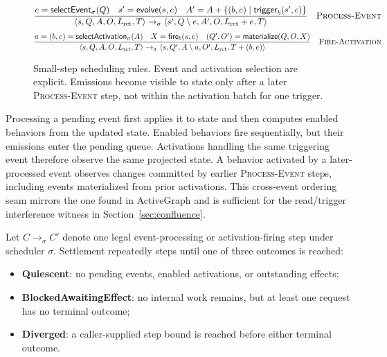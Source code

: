 \begin{figure}[ht]
\centering
\small
\begin{minipage}{0.96\textwidth}
\[
\frac{
 e=\mathsf{selectEvent}_{\sigma}(Q)\quad
 s'=\mathsf{evolve}(s,e)\quad
 A'=A\mathbin{+}\{(b,e)\mid \mathsf{trigger}_b(s',e)\}
}{
 \langle s,Q,A,O,L_{\mathrm{ret}},T\rangle
 \rightarrow_{\sigma}
 \langle s',Q\setminus e,A',O,L_{\mathrm{ret}}\mathbin{+}e,T\rangle
}
\quad\textsc{Process-Event}
\]
\[
\frac{
 a=(b,e)=\mathsf{selectActivation}_{\sigma}(A)\quad
 X=\mathsf{fire}_b(s,e)\quad
 (Q',O')=\mathsf{materialize}(Q,O,X)
}{
 \langle s,Q,A,O,L_{\mathrm{ret}},T\rangle
 \rightarrow_{\sigma}
 \langle s,Q',A\setminus a,O',L_{\mathrm{ret}},T\mathbin{+}(b,e)\rangle
}
\quad\textsc{Fire-Activation}
\]
\end{minipage}
\caption{Small-step scheduling rules.  Event and activation selection are
explicit.  Emissions become visible to state only after a later
\textsc{Process-Event} step, not within the activation batch for one trigger.}
\label{fig:small-step}
\end{figure}

Processing a pending event first applies it to state and then computes enabled
behaviors from the updated state.  Enabled behaviors fire sequentially, but
their emissions enter the pending queue.  Activations handling the same
triggering event therefore observe the same projected state.  A behavior
activated by a later-processed event observes changes committed by earlier
\textsc{Process-Event} steps, including events materialized from prior
activations.  This cross-event ordering seam mirrors the one found in
ActiveGraph and is sufficient for the read/trigger interference witness in
Section~\ref{sec:confluence}.

Let $C\rightarrow_\sigma C'$ denote one legal event-processing or
activation-firing step under scheduler $\sigma$.  Settlement repeatedly steps
until one of three outcomes is reached:

\begin{itemize}[leftmargin=*]
  \item \textbf{Quiescent}: no pending events, enabled activations, or
  outstanding effects;
  \item \textbf{BlockedAwaitingEffect}: no internal work remains, but at least
  one request has no terminal outcome;
  \item \textbf{Diverged}: a caller-supplied step bound is reached before either
  terminal outcome.
\end{itemize}

